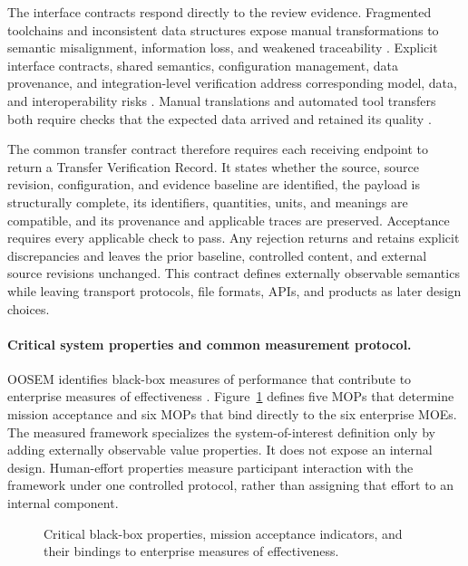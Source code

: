 \documentclass[11pt,a4paper]{article}
\begin{document}
The interface contracts respond directly to the review evidence. Fragmented toolchains and inconsistent data structures expose manual transformations to semantic misalignment, information loss, and weakened traceability \citep[Sec.~5.1 and Table~5]{buruso2026modelbased}. Explicit interface contracts, shared semantics, configuration management, data provenance, and integration-level verification address corresponding model, data, and interoperability risks \citep[Secs.~8.4--8.6 and Table~13]{rostamnia2026digitaltwin}. Manual translations and automated tool transfers both require checks that the expected data arrived and retained its quality \citep[Sec.~4.2.3]{rojasramirez2022comparative}.

The common transfer contract therefore requires each receiving endpoint to return a Transfer Verification Record. It states whether the source, source revision, configuration, and evidence baseline are identified, the payload is structurally complete, its identifiers, quantities, units, and meanings are compatible, and its provenance and applicable traces are preserved. Acceptance requires every applicable check to pass. Any rejection returns and retains explicit discrepancies and leaves the prior baseline, controlled content, and external source revisions unchanged. This contract defines externally observable semantics while leaving transport protocols, file formats, APIs, and products as later design choices.

\paragraph{Critical system properties and common measurement protocol.}
OOSEM identifies black-box measures of performance that contribute to enterprise measures of effectiveness \citep[Sec.~17.3.3]{friedenthal2014practical}. Figure~\ref{fig:framework-critical-properties} defines five MOPs that determine mission acceptance and six MOPs that bind directly to the six enterprise MOEs. The measured framework specializes the system-of-interest definition only by adding externally observable value properties. It does not expose an internal design. Human-effort properties measure participant interaction with the framework under one controlled protocol, rather than assigning that effort to an internal component.

\begin{figure}[H]
    \centering
    \resizebox{\linewidth}{!}{}
    \caption{Critical black-box properties, mission acceptance indicators, and their bindings to enterprise measures of effectiveness.}
    \label{fig:framework-critical-properties}
\end{figure}
\end{document}
